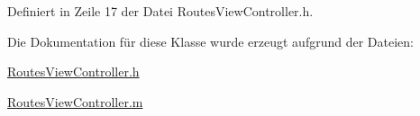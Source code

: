 Definiert in Zeile 17 der Datei RoutesViewController.h.

Die Dokumentation für diese Klasse wurde erzeugt aufgrund der Dateien:\begin{DoxyCompactItemize}
\item 
\hyperlink{_routes_view_controller_8h}{RoutesViewController.h}\item 
\hyperlink{_routes_view_controller_8m}{RoutesViewController.m}\end{DoxyCompactItemize}
